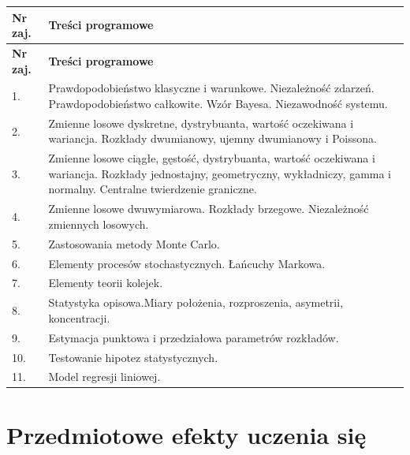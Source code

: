 \documentclass[12pt, a4paper]{article}
\newcommand{\thdrule}{\noalign{\global\setlength{\extrarowheight}{0pt}}}
\newcommand{\thdend}{\noalign{\global\setlength{\extrarowheight}{3pt}}}
\begin{document}
{\scriptsize
\begin{longtable}{m{1.5cm}m{14.5cm}}
\thdrule\toprule
\rowcolor{pjatkRed} {\color{white}\textbf{Nr zaj.}} & {\color{white}\textbf{Treści programowe}} \\
\midrule\thdend
\endfirsthead
\thdrule\toprule
\rowcolor{pjatkRed} {\color{white}\textbf{Nr zaj.}} & {\color{white}\textbf{Treści programowe}} \\
\midrule\thdend
\endhead
  \rowcolor{tableRowLight} 1. & Prawdopodobieństwo klasyczne i warunkowe. Niezależność zdarzeń. Prawdopodobieństwo całkowite. Wzór Bayesa. Niezawodność systemu. \\
  \rowcolor{tableRowAlt} 2. & Zmienne losowe dyskretne, dystrybuanta, wartość oczekiwana i wariancja. Rozkłady dwumianowy, ujemny dwumianowy i Poissona. \\
  \rowcolor{tableRowLight} 3. & Zmienne losowe ciągłe, gęstość, dystrybuanta, wartość oczekiwana i wariancja. Rozkłady jednostajny, geometryczny, wykładniczy, gamma i normalny. Centralne twierdzenie graniczne. \\
  \rowcolor{tableRowAlt} 4. & Zmienne losowe dwuwymiarowa. Rozkłady brzegowe. Niezależność zmiennych losowych. \\
  \rowcolor{tableRowLight} 5. & Zastosowania metody Monte Carlo. \\
  \rowcolor{tableRowAlt} 6. & Elementy procesów stochastycznych. Łańcuchy Markowa. \\
  \rowcolor{tableRowLight} 7. & Elementy teorii kolejek. \\
  \rowcolor{tableRowAlt} 8. & Statystyka opisowa.Miary położenia, rozproszenia, asymetrii, koncentracji. \\
  \rowcolor{tableRowLight} 9. & Estymacja punktowa i przedziałowa parametrów rozkładów. \\
  \rowcolor{tableRowAlt} 10. & Testowanie hipotez statystycznych. \\
  \rowcolor{tableRowLight} 11. & Model regresji liniowej. \\
\bottomrule
\end{longtable}}

\section{Przedmiotowe efekty uczenia się}
\end{document}

